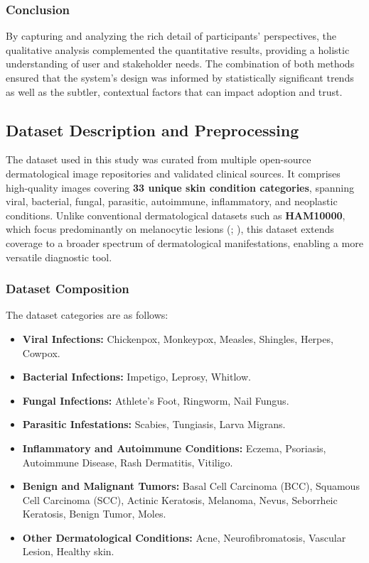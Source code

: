 \documentclass[
  12pt,
  oneside]{article}
\providecommand{\tightlist}{%
  \setlength{\itemsep}{0pt}\setlength{\parskip}{0pt}}
\begin{document}
\subsubsection{Conclusion}\label{conclusion-1}

By capturing and analyzing the rich detail of participants'
perspectives, the qualitative analysis complemented the quantitative
results, providing a holistic understanding of user and stakeholder
needs. The combination of both methods ensured that the system's design
was informed by statistically significant trends as well as the subtler,
contextual factors that can impact adoption and trust.

\subsection{Dataset Description and
Preprocessing}\label{dataset-description-and-preprocessing}

The dataset used in this study was curated from multiple open-source
dermatological image repositories and validated clinical sources. It
comprises high-quality images covering \textbf{33 unique skin condition
categories}, spanning viral, bacterial, fungal, parasitic, autoimmune,
inflammatory, and neoplastic conditions. Unlike conventional
dermatological datasets such as \textbf{HAM10000}, which focus
predominantly on melanocytic lesions (; ), this dataset extends coverage to a broader spectrum of
dermatological manifestations, enabling a more versatile diagnostic
tool.

\subsubsection{Dataset Composition}\label{dataset-composition}

The dataset categories are as follows:

\begin{itemize}
\tightlist
\item
  \textbf{Viral Infections:} Chickenpox, Monkeypox, Measles, Shingles,
  Herpes, Cowpox.
\item
  \textbf{Bacterial Infections:} Impetigo, Leprosy, Whitlow.
\item
  \textbf{Fungal Infections:} Athlete's Foot, Ringworm, Nail Fungus.
\item
  \textbf{Parasitic Infestations:} Scabies, Tungiasis, Larva Migrans.
\item
  \textbf{Inflammatory and Autoimmune Conditions:} Eczema, Psoriasis,
  Autoimmune Disease, Rash Dermatitis, Vitiligo.
\item
  \textbf{Benign and Malignant Tumors:} Basal Cell Carcinoma (BCC),
  Squamous Cell Carcinoma (SCC), Actinic Keratosis, Melanoma, Nevus,
  Seborrheic Keratosis, Benign Tumor, Moles.
\item
  \textbf{Other Dermatological Conditions:} Acne, Neurofibromatosis,
  Vascular Lesion, Healthy skin.
\end{itemize}
\end{document}
